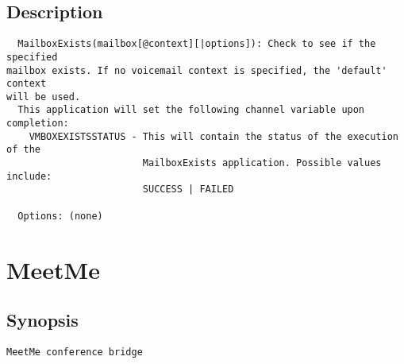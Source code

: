 \subsection{Description}
\begin{verbatim}
  MailboxExists(mailbox[@context][|options]): Check to see if the specified
mailbox exists. If no voicemail context is specified, the 'default' context
will be used.
  This application will set the following channel variable upon completion:
    VMBOXEXISTSSTATUS - This will contain the status of the execution of the
                        MailboxExists application. Possible values include:
                        SUCCESS | FAILED

  Options: (none)

\end{verbatim}


\section{MeetMe}
\subsection{Synopsis}
\begin{verbatim}
MeetMe conference bridge
\end{verbatim}
